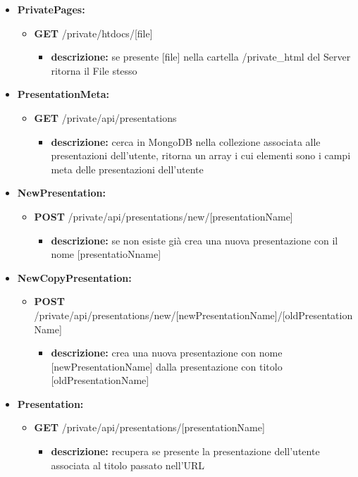 {\begin{itemize}
		\item \textbf{PrivatePages:}
			\begin{itemize}
			\item  \textbf{GET} /private/htdocs/[file] 
				\begin{itemize} 
				\item \textbf{descrizione:} se presente [file] nella cartella /private\_html del Server\ped{g} ritorna il File stesso
				\end{itemize}
			\end{itemize}
			
		\item \textbf{PresentationMeta:}
			\begin{itemize}
			\item  \textbf{GET} /private/api/presentations 
				\begin{itemize} 
				\item \textbf{descrizione:} cerca in MongoDB nella collezione associata alle presentazioni dell'utente, ritorna un array i cui elementi sono i campi meta delle presentazioni dell'utente
				\end{itemize}
			\end{itemize}
			
		\item \textbf{NewPresentation:}
			\begin{itemize}
			\item  \textbf{POST} /private/api/presentations/new/[presentationName] 
				\begin{itemize} 
				\item \textbf{descrizione:} se non esiste gi\`{a} crea una nuova presentazione con il nome [presentatioNname]
				\end{itemize}
			\end{itemize}
			
		\item \textbf{NewCopyPresentation:}
			\begin{itemize}
			\item  \textbf{POST} /private/api/presentations/new/[newPresentationName]/[oldPresentationName]
				\begin{itemize} 
				\item \textbf{descrizione:} crea una nuova presentazione con nome [newPresentationName] dalla presentazione con titolo [oldPresentationName]
				\end{itemize}
			\end{itemize}

			
		\item \textbf{Presentation:}
			\begin{itemize}
			\item  \textbf{GET} /private/api/presentations/[presentationName]
				\begin{itemize} 
				\item \textbf{descrizione:} recupera se presente la presentazione dell'utente associata al titolo passato nell'URL
				\end{itemize}
				

\end{itemize}
\end{itemize}}
